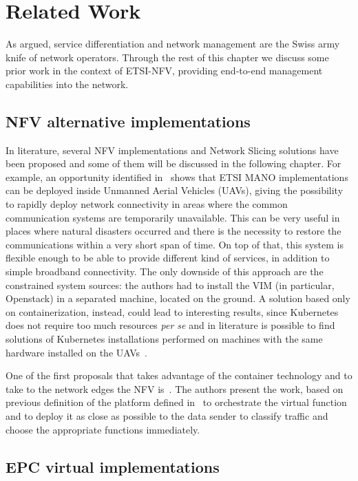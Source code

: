 \chapter{Related Work}
\label{chap:rel_wk}

As argued, service differentiation and network management are the Swiss army
knife of network operators. Through the rest of this chapter we discuss some
prior work in the context of ETSI-NFV, providing end-to-end management
capabilities into the network.

\section{NFV alternative implementations}

In literature, several NFV implementations and Network Slicing solutions have been
proposed and some of them will be discussed in the following chapter. For
example, an opportunity identified in~\cite{nogales2018nfv} shows that ETSI MANO
implementations can be deployed inside Unmanned Aerial Vehicles (UAVs), giving
the possibility to rapidly deploy network connectivity in areas where the common
communication systems are temporarily unavailable. This can be very useful in
places where natural disasters occurred and there is the necessity to restore
the communications within a very short span of time. On top of that, this system
is flexible enough to be able to provide different kind of services, in addition
to simple broadband connectivity. The only downside of this approach are the
constrained system sources: the authors had to install the VIM (in particular,
Openstack) in a separated machine, located on the ground. A solution based only
on containerization, instead, could lead to interesting results, since
Kubernetes does not require too much resources \textit{per se} and in literature
is possible to find solutions of Kubernetes installations performed on machines
with the same hardware installed on the UAVs~\cite{pahl2016container}.

One of the first proposals that takes advantage of the container technology and
to take to the network edges the NFV is~\cite{cziva2017container}. The authors
present the work, based on previous definition of the platform defined
in~\cite{cziva2015container} to orchestrate the virtual function and to deploy
it as close as possible to the data sender to classify traffic and choose the
appropriate functions immediately.

\section{EPC virtual implementations}

